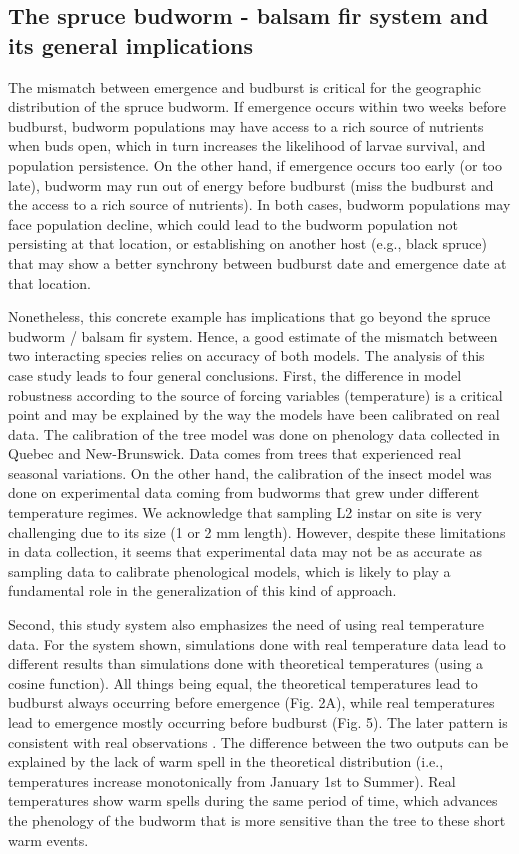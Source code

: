 \documentclass[12 pt]{article}
\begin{document}
\subsection{The spruce budworm - balsam fir system and its general implications}\label{discussioncasestudy}
The mismatch between emergence and budburst is critical for the geographic distribution of the spruce budworm. If emergence occurs within two weeks before budburst, budworm populations may have access to a rich source of nutrients when buds open, which in turn increases the likelihood of larvae survival, and population persistence. On the other hand, if emergence occurs too early (or too late), budworm may run out of energy before budburst (miss the budburst and the access to a rich source of nutrients). In both cases, budworm populations may face population decline, which could lead to the budworm population not persisting at that location, or establishing on another host (e.g., black spruce) that may show a better synchrony between budburst date and emergence date at that location. \par
Nonetheless, this concrete example has implications that go beyond the spruce budworm / balsam fir system. Hence, a good estimate of the mismatch between two interacting species relies on accuracy of both models. The analysis of this case study leads to four general conclusions. First, the difference in model robustness according to the source of forcing variables (temperature) is a critical point and may be explained by the way the models have been calibrated on real data. The calibration of the tree model was done on phenology data collected in Quebec and New-Brunswick. Data comes from trees that experienced real seasonal variations. On the other hand, the calibration of the insect model was done on experimental data \citep{Regniere1990} coming from budworms that grew under different temperature regimes. We acknowledge that sampling L2 instar on site is very challenging due to its size (1 or 2 mm length). However, despite these limitations in data collection, it seems that experimental data may not be as accurate as sampling data to calibrate phenological models, which is likely to play a fundamental role in the generalization of this kind of approach.\par 
Second, this study system also emphasizes the need of using real temperature data. For the system shown, simulations done with real temperature data lead to different results than simulations done with theoretical temperatures (using a cosine function). All things being equal, the theoretical temperatures lead to budburst always occurring before emergence (Fig. 2A), while real temperatures lead to emergence mostly occurring before budburst (Fig. 5). The later pattern is consistent with real observations \citep{Pureswaran2019}. The difference between the two outputs can be explained by the lack of warm spell in the theoretical distribution (i.e., temperatures increase monotonically from January 1st to Summer). Real temperatures show warm spells during the same period of time, which advances the phenology of the budworm that is more sensitive than the tree to these short warm events. \par
\end{document}
